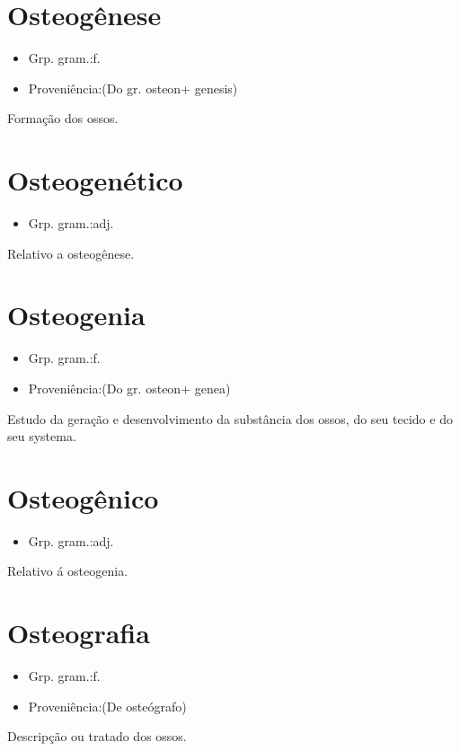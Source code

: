 \section{Osteogênese}
\begin{itemize}
\item {Grp. gram.:f.}
\end{itemize}
\begin{itemize}
\item {Proveniência:(Do gr. \textunderscore osteon\textunderscore  + \textunderscore genesis\textunderscore )}
\end{itemize}
Formação dos ossos.
\section{Osteogenético}
\begin{itemize}
\item {Grp. gram.:adj.}
\end{itemize}
Relativo a osteogênese.
\section{Osteogenia}
\begin{itemize}
\item {Grp. gram.:f.}
\end{itemize}
\begin{itemize}
\item {Proveniência:(Do gr. \textunderscore osteon\textunderscore  + \textunderscore genea\textunderscore )}
\end{itemize}
Estudo da geração e desenvolvimento da substância dos ossos, do seu tecido e do seu systema.
\section{Osteogênico}
\begin{itemize}
\item {Grp. gram.:adj.}
\end{itemize}
Relativo á osteogenia.
\section{Osteografia}
\begin{itemize}
\item {Grp. gram.:f.}
\end{itemize}
\begin{itemize}
\item {Proveniência:(De \textunderscore osteógrafo\textunderscore )}
\end{itemize}
Descripção ou tratado dos ossos.
